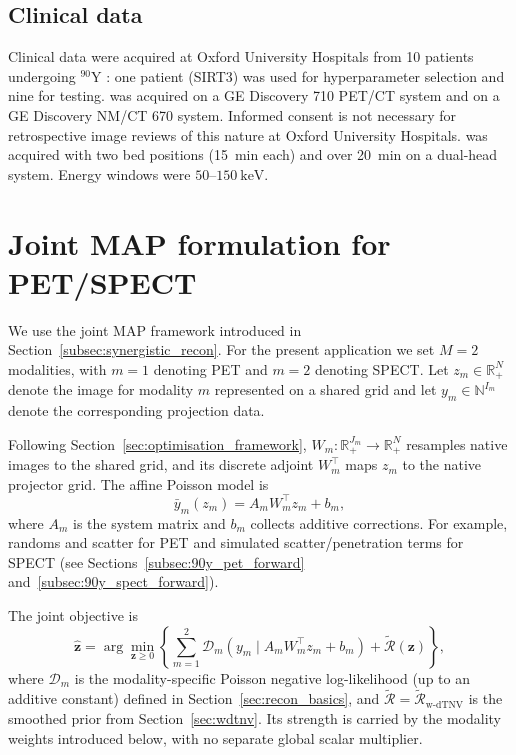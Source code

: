 \subsection{Clinical data}
\label{subsec:90y_clinical}

Clinical data were acquired at Oxford University Hospitals from 10 patients undergoing $^{90}$Y : one patient (SIRT3) was used for hyperparameter selection and nine for testing.  was acquired on a GE Discovery 710 PET/CT system and  on a GE Discovery NM/CT 670 system. Informed consent is not necessary for retrospective image reviews of this nature at Oxford University Hospitals.  was acquired with two bed positions (\SI{15}{\minute} each) and  over \SI{20}{\minute} on a dual-head system. Energy windows were $50$--$150~\mathrm{keV}$.

\section{Joint MAP formulation for PET/SPECT}
\label{sec:90y_joint_map}

We use the joint MAP framework introduced in Section~\ref{subsec:synergistic_recon}. For the present application we set $M=2$ modalities, with $m=1$ denoting PET and $m=2$ denoting SPECT\@. Let $z_m\in\mathbb{R}_+^{N}$ denote the image for modality $m$ represented on a shared grid and let $y_m\in\mathbb{N}^{I_m}$ denote the corresponding projection data.

Following Section~\ref{sec:optimisation_framework}, $W_m:\mathbb{R}_+^{J_m}\to\mathbb{R}_+^{N}$ resamples native images to the shared grid, and its discrete adjoint $W_m^\top$ maps $z_m$ to the native projector grid. The affine Poisson model is
\begin{equation}
\bar y_m(z_m) = A_m W_m^\top z_m + b_m,
\end{equation}
where $A_m$ is the system matrix and $b_m$ collects additive corrections. For example, randoms and scatter for PET and simulated scatter/penetration terms for SPECT (see Sections~\ref{subsec:90y_pet_forward} and~\ref{subsec:90y_spect_forward}).

The joint objective is
\begin{equation}
\hat{\bm{z}}
=
\arg\min_{\bm{z}\ge 0}
\left\{
\sum_{m=1}^{2}\mathcal{D}_m\!\left(y_m \mid A_m W_m^\top z_m + b_m\right)
+
\widetilde{\mathcal{R}}(\bm{z})
\right\},
\label{eq:90y_joint_obj}
\end{equation}
where $\mathcal{D}_m$ is the modality-specific Poisson negative log-likelihood (up to an additive constant) defined in Section~\ref{sec:recon_basics}, and $\widetilde{\mathcal{R}}=\widetilde{\mathcal{R}}_{\mathrm{w\text{-}dTNV}}$ is the smoothed prior from Section~\ref{sec:wdtnv}. Its strength is carried by the modality weights introduced below, with no separate global scalar multiplier.

